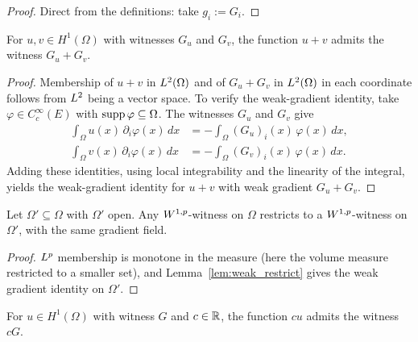 \begin{proof}
\leanok

Direct from the definitions: take $g_i := G_i$.
\end{proof}

\begin{lemma}
\label{lem:witness_add}
\leanok
{}
For $u, v \in H^1(\Omega)$ with witnesses $G_u$ and $G_v$, the function $u + v$
admits the witness $G_u + G_v$.
\end{lemma}

\begin{proof}
\leanok

Membership of $u+v$ in $L^{2}(\Omega)$ and of $G_u + G_v$ in $L^{2}(\Omega)$
in each coordinate follows from $L^{2}$ being a vector space. To verify the
weak-gradient identity, take $\varphi \in C_c^\infty(E)$ with $\operatorname{supp}\varphi
\subseteq \Omega$. The witnesses $G_u$ and $G_v$ give
\begin{align*}
  \int_\Omega u(x)\,\partial_i\varphi(x)\,dx
    &= -\int_\Omega (G_u)_i(x)\,\varphi(x)\,dx, \\
  \int_\Omega v(x)\,\partial_i\varphi(x)\,dx
    &= -\int_\Omega (G_v)_i(x)\,\varphi(x)\,dx.
\end{align*}
Adding these identities, using local integrability and the linearity of the
integral, yields the weak-gradient identity for $u + v$ with weak gradient
$G_u + G_v$.
\end{proof}

\begin{lemma}
\label{lem:MemW1pWitness_restrict}
\leanok
{}
Let $\Omega' \subseteq \Omega$ with $\Omega'$ open. Any
$W^{1,p}$-witness on $\Omega$ restricts to a $W^{1,p}$-witness on
$\Omega'$, with the same gradient field.
\end{lemma}

\begin{proof}
\leanok
{}

$L^{p}$ membership is monotone in the measure (here the volume measure
restricted to a smaller set), and Lemma~\ref{lem:weak_restrict} gives the weak
gradient identity on $\Omega'$.
\end{proof}

\begin{lemma}
\label{lem:MemW1pWitness_smul}
\leanok
{}
For $u \in H^1(\Omega)$ with witness $G$ and $c \in \mathbb{R}$, the function $cu$
admits the witness $cG$.
\end{lemma}

